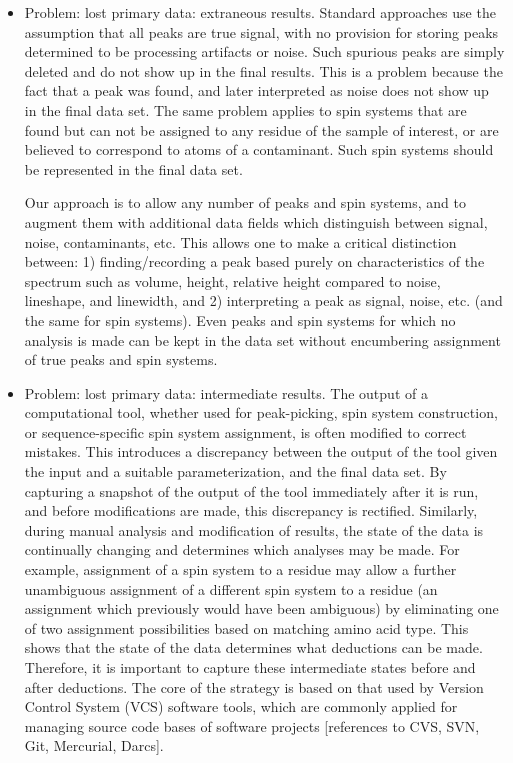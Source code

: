 \documentclass[a4paper]{report}
\begin{document}
\begin{itemize}
  \item Problem: lost primary data:  extraneous results.  Standard approaches use the 
assumption that all peaks are true signal, with no provision for storing peaks 
determined to be processing artifacts or noise.  Such spurious peaks are simply 
deleted and do not show up in the final results.  This is a problem because the 
fact that a peak was found, and later interpreted as noise does not show up in 
the final data set.  The same problem applies to spin systems that are found 
but can not be assigned to any residue of the sample of interest, or are 
believed to correspond to atoms of a contaminant.  Such spin systems should 
be represented in the final data set.

Our approach is to allow any number of peaks and spin systems, and to 
augment them with additional data fields which distinguish between signal, 
noise, contaminants, etc.  This allows one to make a critical distinction 
between: 1) finding/recording a peak based purely on characteristics of 
the spectrum such as volume, height, relative height compared to noise, 
lineshape, and linewidth, and 2) interpreting a peak as signal, noise, 
etc. (and the same for spin systems).  Even peaks and spin systems for 
which no analysis is made can be kept in the data set without encumbering 
assignment of true peaks and spin systems.

  \item Problem: lost primary data: intermediate results.  The output of a 
computational tool, whether used for peak-picking, spin system construction, 
or sequence-specific spin system assignment, is often modified to correct 
mistakes.  This introduces a discrepancy between the output of the tool 
given the input and a suitable parameterization, and the final data set.  
By capturing a snapshot of the output of the tool immediately after it is 
run, and before modifications are made, this discrepancy is rectified.
Similarly, during manual analysis and modification of results, the state of 
the data is continually changing and determines which analyses may be made.  
For example, assignment of a spin system to a residue may allow a further 
unambiguous assignment of a different spin system to a residue (an assignment 
which previously would have been ambiguous) by eliminating one of two 
assignment possibilities based on matching amino acid type.  This shows that 
the state of the data determines what deductions can be made.  Therefore, it 
is important to capture these intermediate states before and after deductions.
The core of the strategy is based on that used by Version Control System (VCS) 
software tools, which are commonly applied for managing source code bases of 
software projects \cite{loeliger2012git}
[references to CVS, SVN, Git, Mercurial, Darcs].  


\end{itemize}
\end{document}
